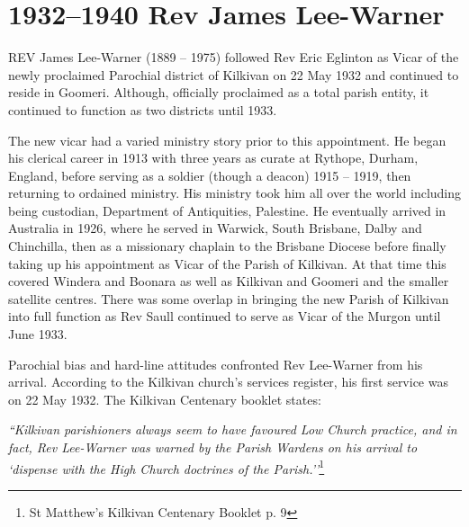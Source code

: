\printendnotes[custom]
\setcounter{endnote}{0}




\chapter{1932--1940 Rev James Lee-Warner}
\nobalance


\lettrine[lines=3]{R}{EV}
 James Lee-Warner (1889 -- 1975) followed Rev Eric Eglinton as Vicar of the newly proclaimed Parochial district of Kilkivan on 22 May 1932 and continued to reside in Goomeri. Although, officially proclaimed as a total parish entity, it continued to function as two districts until 1933.

The new vicar had a varied ministry story prior to this appointment. He began his clerical career in 1913 with three years as curate at Rythope, Durham, England, before serving as a soldier (though a deacon) 1915 -- 1919, then returning to ordained ministry. His ministry took him all over the world including being custodian, Department of Antiquities, Palestine. He eventually arrived in Australia in 1926, where he served in Warwick, South Brisbane, Dalby and Chinchilla, then as a missionary chaplain to the Brisbane Diocese before finally taking up his appointment as Vicar of the Parish of Kilkivan. At that time this covered Windera and Boonara as well as Kilkivan and Goomeri and the smaller satellite centres. There was some overlap in bringing the new Parish of Kilkivan into full function as Rev Saull continued to serve as Vicar of the Murgon until June 1933.



Parochial bias and hard-line attitudes confronted Rev Lee-Warner from his arrival. According to the Kilkivan church's services register, his first service was on 22 May 1932. The Kilkivan Centenary booklet states:



\emph{``Kilkivan parishioners always seem to have favoured Low Church practice, and in fact, Rev Lee-Warner was warned by the Parish Wardens on his arrival to `dispense with the High Church doctrines of the Parish.''}\footnote{St Matthew's Kilkivan Centenary Booklet p. 9}


